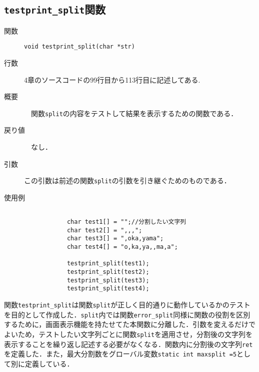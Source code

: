 \documentclass[a4j,11pt]{jarticle}
\begin{document}
\subsection{\texttt{testprint\_split}関数}
 \begin{description}
    \item[関数] \verb|void testprint_split(char *str)|
    \item[行数]  4章のソースコードの99行目から113行目に記述してある. 
    \item[概要]　関数\verb|split|の内容をテストして結果を表示するための関数である．
    \item[戻り値]　なし．
    \item[引数]  この引数は前述の関数\verb|split|の引数を引き継ぐためのものである．
    \item[使用例]
      \begin{verbatim}

    	    char test1[] = "";//分割したい文字列
    	    char test2[] = ",,,";
    	    char test3[] = ",oka,yama";
    	    char test4[] = "o,ka,ya,,ma,a";
    	    
    	    testprint_split(test1);
    	    testprint_split(test2);
    	    testprint_split(test3);
    	    testprint_split(test4);
      \end{verbatim}
\end{description}
関数\verb|testprint_split|は関数\verb|split|が正しく目的通りに動作しているかのテストを目的として作成した．\verb|split|内では関数\verb|error_split|同様に関数の役割を区別するために，画面表示機能を持たせてた本関数に分離した．引数を変えるだけでよいため，テストしたい文字列ごとに関数\verb|split|を適用させ，分割後の文字列を表示することを繰り返し記述する必要がなくなる．関数内に分割後の文字列\verb|ret|を定義した．また，最大分割数をグローバル変数\verb|static int maxsplit =5|として別に定義している．
\end{document}
